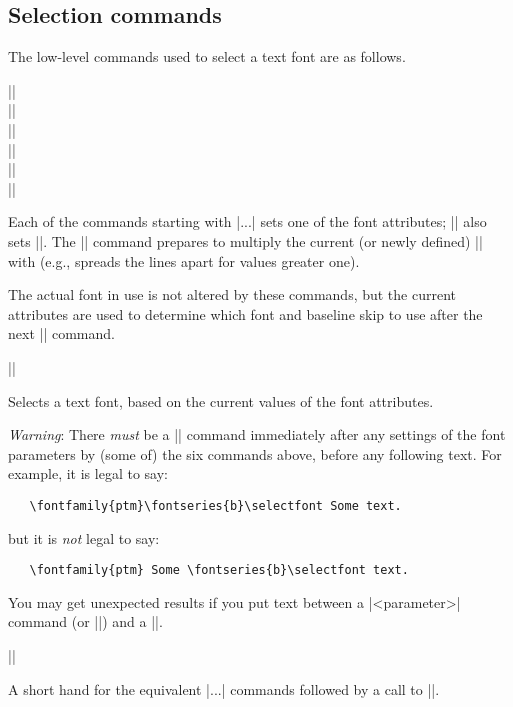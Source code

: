 \documentclass{ltxguide}[1995/11/28]
\begin{document}
\subsection{Selection commands}
 
The low-level commands used to select a text font are as follows.
 
\begin{decl}
|\fontencoding|  \\
|\fontfamily|  \\
|\fontseries| \\
|\fontshape| \\
|\fontsize|  \\
|\linespread| 
\end{decl}
 
Each of the commands starting with |\font...| sets one of the font
attributes; |\fontsize| also sets |\baselineskip|. The |\linespread|
command prepares to multiply the current (or newly defined)
|\baselineskip| with  (e.g., spreads the lines apart for
values greater one).

The actual font in use is not altered by these commands, but the
current attributes are used to determine which font and baseline skip
to use after the next |\selectfont| command.
 

\begin{decl}
|\selectfont|
\end{decl}
Selects a text font, based on the current values of the font attributes.
 
\emph{Warning}: There \emph{must} be a |\selectfont| command
immediately after any settings of the font parameters by (some of)
the six commands above, before any following text.
For example, it is legal to say:
\begin{verbatim}
   \fontfamily{ptm}\fontseries{b}\selectfont Some text.
\end{verbatim}
but it is \emph{not} legal to say:
\begin{verbatim}
   \fontfamily{ptm} Some \fontseries{b}\selectfont text.
\end{verbatim}
You may get unexpected results if you put text between a
|\font<parameter>| command (or |\linespread|) and a |\selectfont|.
 
\begin{decl}
|\usefont|    
\end{decl}
A short hand for the equivalent |\font...| commands followed by a
call to |\selectfont|.
 
\end{document}
